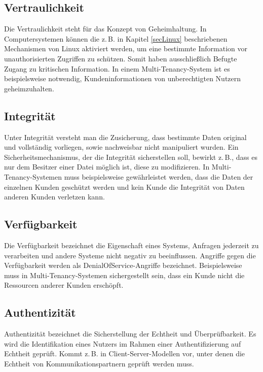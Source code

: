 \documentclass[../main.tex]{subfiles}
\begin{document}


    \subsection{Vertraulichkeit}
			Die Vertraulichkeit steht für das Konzept von Geheimhaltung. In Computersystemen können die z.\,B. in Kapitel \ref{secLinux} beschriebenen Mechanismen von Linux aktiviert werden, um eine bestimmte Information vor unauthorisierten Zugriffen zu schützen. Somit haben ausschließlich Befugte Zugang zu kritischen Information. In einem Multi-Tenancy-System ist es beispielsweise notwendig, Kundeninformationen von unberechtigten Nutzern geheimzuhalten.

    \subsection{Integrität}
			Unter Integrität versteht man die Zusicherung, dass bestimmte Daten original und vollständig vorliegen, sowie nachweisbar nicht manipuliert wurden. Ein Sicherheitsmechanismus, der die Integrität sicherstellen soll, bewirkt z.\,B., dass es nur dem Besitzer einer Datei möglich ist, diese zu modifizieren. In Multi-Tenancy-Systemen muss beispielsweise gewährleistet werden, dass die Daten der einzelnen Kunden geschützt werden und kein Kunde die Integrität von Daten anderen Kunden verletzen kann.

    \subsection{Verfügbarkeit}
			Die Verfügbarkeit bezeichnet die Eigenschaft eines Systems, Anfragen jederzeit zu verarbeiten und andere Systeme nicht negativ zu beeinflussen. Angriffe gegen die Verfügbarkeit werden als \gls{DenialOfService}-Angriffe bezeichnet. Beispielsweise muss in Multi-Tenancy-Systemen sichergestellt sein, dass ein Kunde nicht die Ressourcen anderer Kunden erschöpft.

		\subsection{Authentizität}
			Authentizität bezeichnet die Sicherstellung der Echtheit und Überprüfbarkeit. Es wird die Identifikation eines Nutzers im Rahmen einer Authentifizierung auf Echtheit geprüft. Kommt z.\,B. in Client-Server-Modellen vor, unter denen die Echtheit von Kommunikationspartnern geprüft werden muss.
\end{document}

